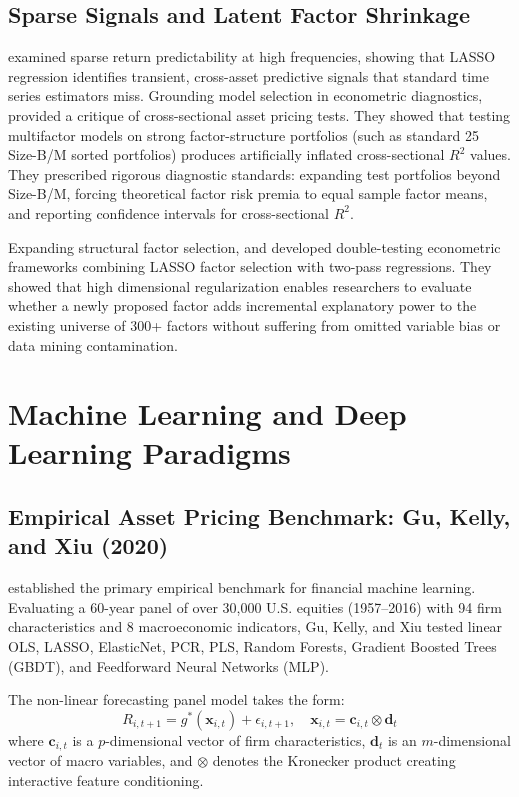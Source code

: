 \subsection{Sparse Signals and Latent Factor Shrinkage}
\citet{chinco2019sparse} examined sparse return predictability at high frequencies, showing that LASSO regression identifies transient, cross-asset predictive signals that standard time series estimators miss. Grounding model selection in econometric diagnostics, \citet{lewellen2010skeptical} provided a critique of cross-sectional asset pricing tests. They showed that testing multifactor models on strong factor-structure portfolios (such as standard 25 Size-B/M sorted portfolios) produces artificially inflated cross-sectional $R^2$ values. They prescribed rigorous diagnostic standards: expanding test portfolios beyond Size-B/M, forcing theoretical factor risk premia to equal sample factor means, and reporting confidence intervals for cross-sectional $R^2$.

Expanding structural factor selection, \citet{feng2020taming} and \citet{giglio2021test} developed double-testing econometric frameworks combining LASSO factor selection with two-pass regressions. They showed that high dimensional regularization enables researchers to evaluate whether a newly proposed factor adds incremental explanatory power to the existing universe of 300+ factors without suffering from omitted variable bias or data mining contamination.

\section{Machine Learning and Deep Learning Paradigms}

\subsection{Empirical Asset Pricing Benchmark: Gu, Kelly, and Xiu (2020)}
\citet{gu2020empirical} established the primary empirical benchmark for financial machine learning. Evaluating a 60-year panel of over 30,000 U.S. equities (1957--2016) with 94 firm characteristics and 8 macroeconomic indicators, Gu, Kelly, and Xiu tested linear OLS, LASSO, ElasticNet, PCR, PLS, Random Forests, Gradient Boosted Trees (GBDT), and Feedforward Neural Networks (MLP).

The non-linear forecasting panel model takes the form:
\begin{equation}
R_{i,t+1} = g^*(\mathbf{x}_{i,t}) + \epsilon_{i,t+1}, \quad \mathbf{x}_{i,t} = \mathbf{c}_{i,t} \otimes \mathbf{d}_t
\label{eq:ch2_gk_model}
\end{equation}
where $\mathbf{c}_{i,t}$ is a $p$-dimensional vector of firm characteristics, $\mathbf{d}_t$ is an $m$-dimensional vector of macro variables, and $\otimes$ denotes the Kronecker product creating interactive feature conditioning.

